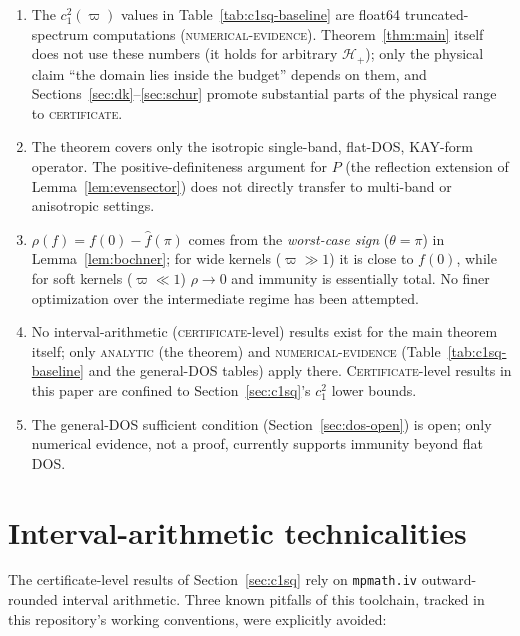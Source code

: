\documentclass[11pt]{article}
\newcommand{\HH}{\mathcal{H}}
\begin{document}
\begin{enumerate}
\item The $c_1^2(\varpi)$ values in Table~\ref{tab:c1sq-baseline} are
float64 truncated-spectrum computations (\textsc{numerical-evidence}).
Theorem~\ref{thm:main} itself does not use these numbers (it holds for
arbitrary $\HH_+$); only the physical claim ``the domain lies inside the
budget'' depends on them, and Sections~\ref{sec:dk}--\ref{sec:schur} promote
substantial parts of the physical range to \textsc{certificate}.
\item The theorem covers only the isotropic single-band, flat-DOS, KAY-form
operator. The positive-definiteness argument for $P$ (the reflection
extension of Lemma~\ref{lem:evensector}) does not directly transfer to
multi-band or anisotropic settings.
\item $\rho(f)=f(0)-\hat f(\pi)$ comes from the \emph{worst-case sign}
($\theta=\pi$) in Lemma~\ref{lem:bochner}; for wide kernels ($\varpi\gg1$) it
is close to $f(0)$, while for soft kernels ($\varpi\ll1$) $\rho\to0$ and
immunity is essentially total. No finer optimization over the intermediate
regime has been attempted.
\item No interval-arithmetic (\textsc{certificate}-level) results exist for
the main theorem itself; only \textsc{analytic} (the theorem) and
\textsc{numerical-evidence} (Table~\ref{tab:c1sq-baseline} and the general-DOS
tables) apply there. \textsc{Certificate}-level results in this paper are
confined to Section~\ref{sec:c1sq}'s $c_1^2$ lower bounds.
\item The general-DOS sufficient condition (Section~\ref{sec:dos-open}) is
open; only numerical evidence, not a proof, currently supports immunity
beyond flat DOS.
\end{enumerate}

\appendix
\section{Interval-arithmetic technicalities}\label{app:iv}

The certificate-level results of Section~\ref{sec:c1sq} rely on
\texttt{mpmath.iv} outward-rounded interval arithmetic. Three known pitfalls
of this toolchain, tracked in this repository's working conventions, were
explicitly avoided:
\end{document}
